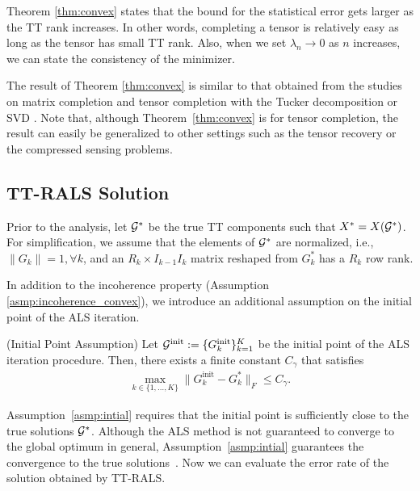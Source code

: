 Theorem \ref{thm:convex} states that the bound for the statistical
error gets larger as the TT rank increases.  In other words,
completing a tensor is relatively easy as long as the tensor has small TT
rank.  Also, when we set $\lambda_n \to 0$ as $n$ increases, we can
state the consistency of the minimizer.


The result of Theorem \ref{thm:convex} is similar to that obtained from the studies on
matrix completion \cite{candes2010matrix, negahban2011estimation} and
tensor completion with the Tucker decomposition or SVD
\cite{tomioka2011statistical, zhang2016exact}.  Note that, although
Theorem~\ref{thm:convex} is for tensor completion, the result can
easily be generalized to other settings such as the tensor recovery or
the compressed sensing problems.


\subsection{TT-RALS Solution} \label{sec:theory}



Prior to the analysis, let $\mathcal{G}^*$ be the true TT components such that
$X^* = X(\mathcal{G}^*)$.  For simplification, we assume that the elements of
$\mathcal{G}^*$ are normalized, i.e., $\|G_k\|=1, \forall k$, and an
$R_k \times I_{k-1}I_k$ matrix reshaped from $G_k^*$ has a $R_k$ row
rank.

In addition to the incoherence property (Assumption \ref{asmp:incoherence_convex}), we introduce an additional assumption on the initial point of the ALS iteration.

\begin{assumption}{(Initial Point Assumption)}\label{asmp:intial}
    Let $\mathcal{G}^{\text{init}} := \{G_k^{\text{init}}\}_{k=1}^K$ be the initial point of the ALS iteration procedure.
    Then, there exists a finite constant $C_{\gamma}$ that satisfies
    \begin{align*}
        \max_{k \in \{1,\ldots,K\}} \|G_k^{\text{init}} - G_k^*\|_F \leq C_{\gamma}.
    \end{align*}
\end{assumption}

Assumption~\ref{asmp:intial} requires that the initial point is
sufficiently close to the true solutions $\mathcal{G}^*$.  Although the ALS
method is not guaranteed to converge to the global optimum in general,
Assumption~\ref{asmp:intial} guarantees the
convergence to the true solutions~\cite{suzuki2016minimax}. Now we can evaluate the error
rate of the solution obtained by TT-RALS.


